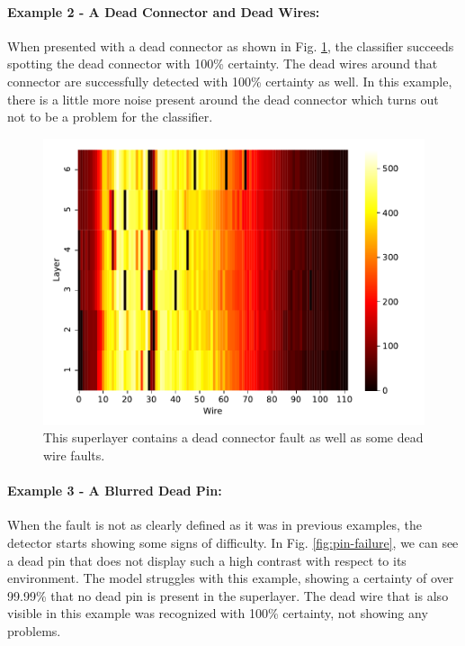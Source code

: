 \paragraph{Example 2 - A Dead Connector and Dead Wires:}

When presented with a dead connector as shown in
Fig. \ref{fig:connector-success}, the classifier succeeds spotting the
dead connector with 100\% certainty. The dead wires around that
connector are successfully detected with 100\% certainty as well. In
this example, there is a little more noise present around the dead
connector which turns out not to be a problem for the classifier.

\begin{figure}
  \includegraphics[width=\textwidth]{../figures/dead_connector_success}
  \caption{This superlayer contains a dead connector fault as well as
    some dead wire faults.}
  \label{fig:connector-success}
\end{figure}

\paragraph{Example 3 - A Blurred Dead Pin:}

When the fault is not as clearly defined as it was in previous
examples, the detector starts showing some signs of
difficulty. In Fig. \ref{fig:pin-failure}, we can see a dead pin that
does not display such a high contrast with respect to its environment.
The model struggles with this example, showing a certainty of over
99.99\% that no dead pin is present in the superlayer. The dead wire
that is also visible in this example was recognized with 100\%
certainty, not showing any problems.


